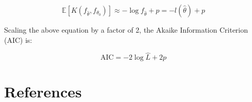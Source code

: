 \documentclass[
11pt, %
oneside, %
english, %
singlespacing, %
]{macthesis} %
\begin{document}
\[
\mathbb{E}[K(f_{\hat{\theta}}, f_{\theta_0})] \approx -\log f_{\hat{\theta}} + p = -l(\hat{\theta}) + p
\]

Scaling the above equation by a factor of 2, the Akaike Information Criterion (AIC) is:

\begin{equation}
\text{AIC} = -2 \log \hat{L} + 2p
\label{eq:AIC}
\end{equation}

\backmatter

\chapter*{References}\label{references}


\noindent

\setlength{\parindent}{-0.20in}
\setlength{\leftskip}{0.20in}
\setlength{\parskip}{8pt}
\end{document}
